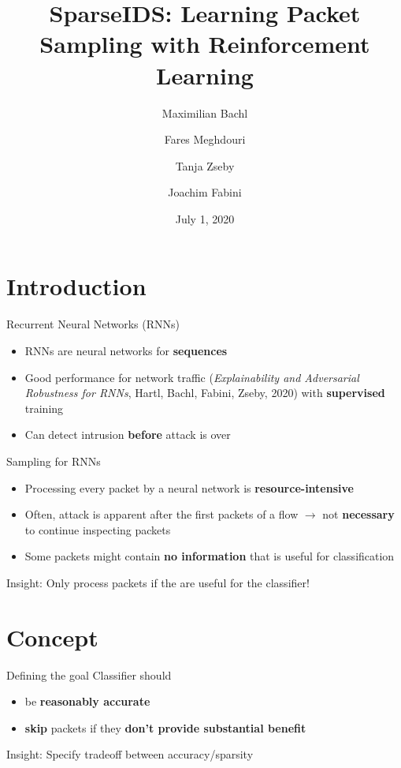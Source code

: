 \documentclass[xcolor={dvipsnames}]{beamer}
\title{SparseIDS: Learning Packet Sampling with Reinforcement Learning}
\author[Maximilian Bachl]{%
	Maximilian Bachl\email{maximilian.bachl@tuwien.ac.at} \and Fares Meghdouri\email{fares.meghdouri@tuwien.ac.at} \and Tanja Zseby\email{tanja.zseby@tuwien.ac.at} \and Joachim Fabini\email{joachim.fabini@tuwien.ac.at}
}
\institute{%
	Technische Universität Wien, Vienna, Austria
}
\date[July 1, 2020]{July 1, 2020}
\begin{document}
\maketitle

\section{Introduction}

\begin{frame}{Recurrent Neural Networks (RNNs)}
\begin{itemize}
\item RNNs are neural networks for \textbf{sequences}
\item Good performance for network traffic (\textit{Explainability and Adversarial Robustness for RNNs}, Hartl, Bachl, Fabini, Zseby, 2020) with \textbf{supervised} training
\item Can detect intrusion \textbf{before} attack is over
\end{itemize}
\end{frame}

\begin{frame}{Sampling for RNNs}
\begin{itemize}
\item Processing every packet by a neural network is \textbf{resource-intensive}
\item Often, attack is apparent after the first packets of a flow $\rightarrow$ not \textbf{necessary} to continue inspecting packets
\item Some packets might contain \textbf{no information} that is useful for classification
\end{itemize}

\pause
\begin{block}{Insight:}
Only process packets if the are useful for the classifier! 
\end{block}

\end{frame}

\section{Concept}

\begin{frame}{Defining the goal}
Classifier should
\begin{itemize}
\item be \textbf{reasonably accurate}
\item \textbf{skip} packets if they \textbf{don't provide substantial benefit}
\end{itemize}

\pause
\begin{block}{Insight:}
Specify tradeoff between accuracy/sparsity 
\end{block}

\end{frame}
\end{document}
